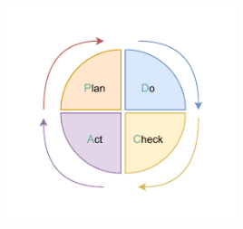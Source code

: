 \begin{center}
    \includegraphics[width=0.5\textwidth]{Chapters/Diagram/Introduction/pdca.drawio.pdf}
\end{center}


